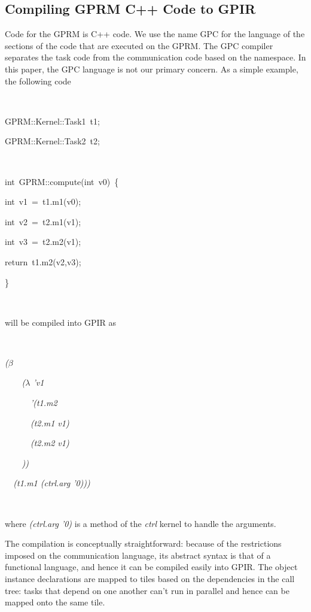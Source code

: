 \documentclass[copyright,creativecommons]{eptcs}
\newenvironment{lyxcode}
{\par\begin{list}{}{
\setlength{\rightmargin}{\leftmargin}
\setlength{\listparindent}{0pt}\raggedright
\setlength{\itemsep}{0pt}
\setlength{\parsep}{0pt}
\normalfont\ttfamily}\item[]}
{\end{list}}
\begin{document}
\subsection{Compiling GPRM C++ Code to GPIR}

Code for the GPRM is C++ code. We use the name GPC for the language
of the sections of the code that are executed on the GPRM. The GPC
compiler separates the task code from the communication code based
on the namespace. In this paper, the GPC language is not our primary
concern. As a simple example, the following code 

~
\begin{lyxcode}
{\small GPRM::Kernel::Task1~t1;}{\small \par}

{\small GPRM::Kernel::Task2~t2;}{\small \par}

~

{\small int~GPRM::compute(int~v0)~\{}{\small \par}

{\small int~v1~=~t1.m1(v0);}{\small \par}

{\small int~v2~=~t2.m1(v1);~}{\small \par}

{\small int~v3~=~t2.m2(v1);~}{\small \par}

{\small return~t1.m2(v2,v3);}{\small \par}

{\small \}}{\small \par}

~
\end{lyxcode}
will be compiled into GPIR as

~

\textit{($\beta$ }

\textit{~~~~($\lambda$ 'v1}

\textit{~~~~~~'(t1.m2 }

\textit{~~~~~~(t2.m1 v1)}

\textit{~~~~~~(t2.m2 v1)}

\textit{~~~~))}

\textit{~~(t1.m1 (ctrl.arg '0)))}

~

where \textit{(ctrl.arg '0)} is a method of the \emph{ctrl} kernel
to handle the arguments. 

The compilation is conceptually straightforward: because of the restrictions
imposed on the communication language, its abstract syntax is that
of a functional language, and hence it can be compiled easily into
GPIR. The object instance declarations are mapped to tiles based on
the dependencies in the call tree: tasks that depend on one another
can't run in parallel and hence can be mapped onto the same tile. 
\end{document}
